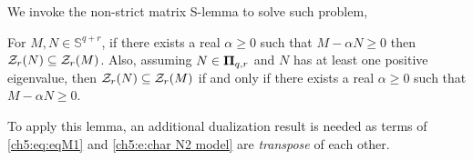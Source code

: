 We invoke the non-strict matrix S-lemma to solve such problem,
\begin{theorem}
\label{t:nonstrictS-lemma}
For $M,N \in \mathbb{S}^{q+r}$, if there exists a real $\alpha \geq 0$ such that $M - \alpha N \geq 0$ then $\mathcal{Z}_r(N) \subseteq \mathcal{Z}_r(M)$.
Also, assuming $N \in \mathbf{\Pi}_{q,r}$ and $N$ has at least one positive eigenvalue, then $\mathcal{Z}_r(N) \subseteq \mathcal{Z}_r(M)$ if and only if there exists a real $\alpha \geq 0$ such that $M-\alpha N \geq 0$. 
\end{theorem}
% 
% 
To apply this lemma, an additional dualization result is needed as terms of \eqref{ch5:eq:eqM1} and \eqref{ch5:e:char N2 model} are \emph{transpose} of each other. 
